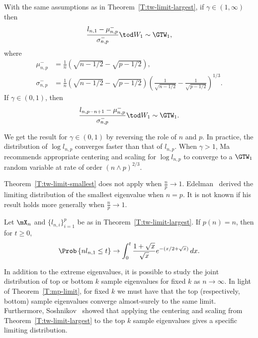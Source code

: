 \begin{theorem}\label{T:tw-limit-smallest}
    With the same assumptions as in Theorem~\ref{T:tw-limit-largest}, if
    $\gamma \in (1,\infty)$ then
    \[
        \frac{l_{n,1} - \mu_{n,p}^-}{\sigma_{n,p}^-}
        \tod
        W_1
        \sim
        \GTW_1,
    \]
    where
    \begin{align*}
        \mu_{n,p}^-
            &=
            \frac{1}{n}
            \left(
                \sqrt{n - 1/2}
                -
                \sqrt{p - 1/2}
            \right), \\
        \sigma_{n,p}^-
            &= 
            \frac{1}{n}
            \left(
                \sqrt{n - 1/2}
                -
                \sqrt{p - 1/2}
            \right)
            \left(
                \frac{1}{\sqrt{n - 1/2}}
                -
                \frac{1}{\sqrt{p - 1/2}}
            \right)^{1/3}.
    \end{align*}
    If $\gamma \in (0, 1)$, then
    \[
        \frac{l_{n,p-n+1} - \mu_{n,p}^-}{\sigma_{n,p}^-}
        \tod
        W_1
        \sim
        \GTW_1.
    \]
\end{theorem}

\noindent
We get the result for $\gamma \in (0,1)$ by reversing the role of $n$ and $p$.
In practice, the distribution of $\log l_{n,p}$ converges faster than that of $l_{n,p}$.  When $\gamma > 1$, Ma~\cite{ma2008atw} recommends appropriate centering and scaling for $\log l_{n,p}$ to converge to a $\GTW_1$ random variable at rate of order $(n \wedge p)^{2/3}$.

Theorem~\ref{T:tw-limit-smallest} does not apply when $\frac{n}{p} \to 1$.  Edelman~\cite{edelman1988ecn} derived the limiting distribution of the smallest eigenvalue when $n = p$.  It is not known if his result holds more generally when $\frac{n}{p} \to 1$.

\begin{theorem}\label{T:edelman-limit-smallest}
    Let $\mX_n$ and $\{ l_{n,i} \}_{i=1}^p$ be as in 
    Theorem~\ref{T:tw-limit-largest}.  If $p(n) = n$, then for $t \geq 0$,
    \[
        \Prob\left\{
            n l_{n,1} \leq t
        \right\}
        \to
        \int_0^t
            \frac{1 + \sqrt{x}}{\sqrt{x}}
            e^{-(x/2 + \sqrt{x})}
            \,
            dx.
    \]
\end{theorem}

In addition to the extreme eigenvalues, it is possible to study the joint distribution of top or bottom $k$ sample eigenvalues for fixed $k$ as
$n \to \infty$.  In light of Theorem~\ref{T:mp-limit}, for fixed $k$ we must have that the top (respectively, bottom) sample eigenvalues converge almost-surely to the same limit.  Furthermore, Soshnikov~\cite{soshnikov2002nud} showed that applying the centering and scaling from Theorem~\ref{T:tw-limit-largest} to the top $k$ sample eigenvalues gives a specific limiting distribution.


